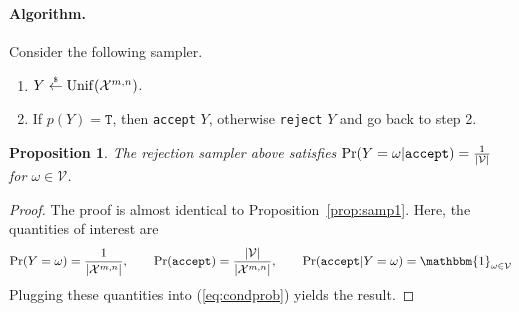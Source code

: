 \documentclass[10pt]{article}
\newtheorem{myprop}{Proposition}
\newcommand{\X}{\mathcal{X}}
\newcommand{\ind}{\mathbbm{1}}
\newcommand{\abs}[1]{\left| #1 \right|}
\newcommand{\Unif}{\mathrm{Unif}}
\renewcommand{\Pr}{\mathrm{Pr}}
\newcommand\rgets{\stackrel{\mathclap{\normalfont\tiny\mbox{\$}}}{\gets}}
\begin{document}
\paragraph{Algorithm.} Consider the following sampler.
\begin{enumerate}
  \item $Y \rgets \Unif(\X^{m,n})$.
  \item If $p(Y) = \texttt{T}$, then \verb|accept| $Y$, otherwise \verb|reject| $Y$ and go back to step 2.
\end{enumerate}
\begin{myprop}
  The rejection sampler above satisfies $\Pr(Y=\omega|\normalfont{\texttt{accept}}) = \frac{1}{\abs{\mathcal{V}}}$ for $\omega \in \mathcal{V}$.
\end{myprop}
\begin{proof}
The proof is almost identical to Proposition~\ref{prop:samp1}. Here, the quantities of interest are
\begin{align*}
  \Pr(Y=\omega) = \frac{1}{\abs{\X^{m,n}}}, \qquad \Pr(\texttt{accept}) = \frac{\abs{\mathcal{V}}}{\abs{\X^{m,n}}}, \qquad \Pr(\texttt{accept}|Y=\omega) = \ind_{\omega \in \mathcal{V}}
\end{align*}
Plugging these quantities into (\ref{eq:condprob}) yields the result.
\end{proof}
\end{document}
